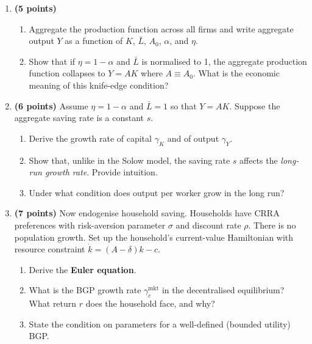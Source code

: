 \documentclass[a4paper,11pt]{article}
\begin{document}
\begin{enumerate}[label=\textbf{\arabic*.}, leftmargin=*, itemsep=6pt]

    \item \textbf{(5 points)}
    \begin{enumerate}[label=(\alph*), itemsep=4pt]
        \item Aggregate the production function across all firms and write aggregate output
        $Y$ as a function of $K$, $\bar{L}$, $A_0$, $\alpha$, and $\eta$.
        \item Show that if $\eta = 1-\alpha$ and $\bar{L}$ is normalised to 1, the aggregate
        production function collapses to $Y = AK$ where $A \equiv A_0$.  What is the
        economic meaning of this knife-edge condition?
    \end{enumerate}

    \item \textbf{(6 points)} Assume $\eta = 1-\alpha$ and $\bar{L}=1$ so that $Y = AK$.
    Suppose the aggregate saving rate is a constant $s$.
    \begin{enumerate}[label=(\alph*), itemsep=4pt]
        \item Derive the growth rate of capital $\gamma_K$ and of output $\gamma_Y$.
        \item Show that, unlike in the Solow model, the saving rate $s$ affects the
        \emph{long-run growth rate}.  Provide intuition.
        \item Under what condition does output per worker grow in the long run?
    \end{enumerate}

    \item \textbf{(7 points)} Now endogenise household saving.  Households have CRRA
    preferences with risk-aversion parameter $\sigma$ and discount rate $\rho$.  There is no
    population growth.  Set up the household's current-value Hamiltonian with resource
    constraint $\dot{k} = (A-\delta)k - c$.
    \begin{enumerate}[label=(\alph*), itemsep=4pt]
        \item Derive the \textbf{Euler equation}.
        \item What is the BGP growth rate $\gamma_c^{\mathrm{mkt}}$ in the decentralised
        equilibrium?  What return $r$ does the household face, and why?
        \item State the condition on parameters for a well-defined (bounded utility) BGP.
    \end{enumerate}


\end{enumerate}
\end{document}
